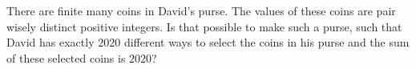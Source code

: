 There are finite many coins in David’s purse. The values of these coins are pair wisely distinct positive integers. Is that possible to make such a purse, such that David has exactly $2020$ different ways to select the coins in his purse and the sum of these selected coins is $2020$?